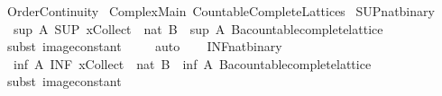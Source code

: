 %
\begin{isabellebody}%
%
%
\isadelimdocument
%
\endisadelimdocument
%
\isatagdocument
%
\isamarkuptrue%
%
\endisatagdocument
{\isafolddocument}%
%
\isadelimdocument
%
\endisadelimdocument
%
\isadelimtheory
%
\endisadelimtheory
%
\isatagtheory
{}\isamarkupfalse%
\ Order{\isacharunderscore}Continuity\isanewline
{}\ Complex{\isacharunderscore}Main\ Countable{\isacharunderscore}Complete{\isacharunderscore}Lattices\isanewline
{}%
\endisatagtheory
{\isafoldtheory}%
%
\isadelimtheory
\isanewline
%
\endisadelimtheory
\isanewline
\isanewline
\isanewline
{}\isamarkupfalse%
\ SUP{\isacharunderscore}nat{\isacharunderscore}binary{\isacharcolon}\isanewline
\ \ {\isachardoublequoteopen}{\isacharparenleft}sup\ A\ {\isacharparenleft}SUP\ x{\isasymin}Collect\ {\isacharparenleft}{\isacharparenleft}{\isacharless}{\isacharparenright}\ {\isacharparenleft}{}{\isacharcolon}{\isacharcolon}nat{\isacharparenright}{\isacharparenright}{\isachardot}\ B{\isacharparenright}{\isacharparenright}\ {\isacharequal}\ {\isacharparenleft}sup\ A\ B{\isacharcolon}{\isacharcolon}{\isacharprime}a{\isacharcolon}{\isacharcolon}countable{\isacharunderscore}complete{\isacharunderscore}lattice{\isacharparenright}{\isachardoublequoteclose}\isanewline
%
\isadelimproof
\ \ %
\endisadelimproof
%
\isatagproof
{}\isamarkupfalse%
\ {\isacharparenleft}subst\ image{\isacharunderscore}constant{\isacharparenright}\isanewline
\ \ \ \isamarkupfalse%
\ auto\isanewline
\ \ \isamarkupfalse%
%
\endisatagproof
{\isafoldproof}%
%
\isadelimproof
\isanewline
%
\endisadelimproof
\isanewline
{}\isamarkupfalse%
\ INF{\isacharunderscore}nat{\isacharunderscore}binary{\isacharcolon}\isanewline
\ \ {\isachardoublequoteopen}inf\ A\ {\isacharparenleft}INF\ x{\isasymin}Collect\ {\isacharparenleft}{\isacharparenleft}{\isacharless}{\isacharparenright}\ {\isacharparenleft}{}{\isacharcolon}{\isacharcolon}nat{\isacharparenright}{\isacharparenright}{\isachardot}\ B{\isacharparenright}\ {\isacharequal}\ {\isacharparenleft}inf\ A\ B{\isacharcolon}{\isacharcolon}{\isacharprime}a{\isacharcolon}{\isacharcolon}countable{\isacharunderscore}complete{\isacharunderscore}lattice{\isacharparenright}{\isachardoublequoteclose}\isanewline
%
\isadelimproof
\ \ %
\endisadelimproof
%
\isatagproof
{}\isamarkupfalse%
\ {\isacharparenleft}subst\ image{\isacharunderscore}constant{\isacharparenright}\isanewline

\end{isabellebody}
